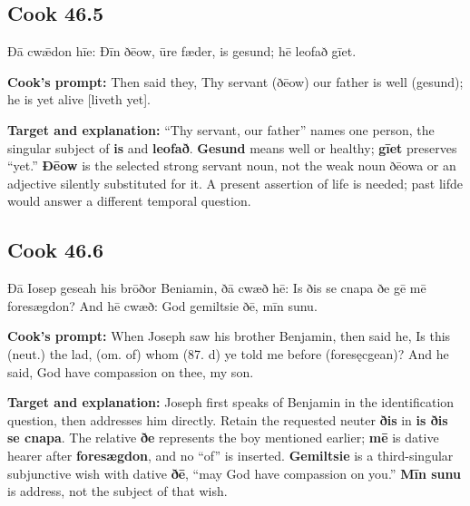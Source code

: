 \par\begin{minipage}{\linewidth}\raggedright
\subsection*{Cook 46.5}

Ðā cwǣdon hīe: Ðīn ðēow, ūre fæder, is gesund; hē leofað gīet.

\textbf{Cook’s prompt:} Then said they, Thy servant (ðēow) our father is well (gesund); he is yet alive [liveth yet].

\textbf{Target and explanation:} “Thy servant, our father” names one person, the singular subject of \textbf{is} and \textbf{leofað}. \textbf{Gesund} means well or healthy; \textbf{gīet} preserves “yet.” \textbf{Ðēow} is the selected strong servant noun, not the weak noun ðēowa or an adjective silently substituted for it. A present assertion of life is needed; past lifde would answer a different temporal question.

\end{minipage}\par\addvspace{4pt}

\par\begin{minipage}{\linewidth}\raggedright
\subsection*{Cook 46.6}

Ðā Iosep geseah his brōðor Beniamin, ðā cwæð hē: Is ðis se cnapa ðe gē mē foresægdon? And hē cwæð: God gemiltsie ðē, mīn sunu.

\textbf{Cook’s prompt:} When Joseph saw his brother Benjamin, then said he, Is this (neut.) the lad, (om. of) whom (87. d) ye told me before (foresęcgean)? And he said, God have compassion on thee, my son.

\textbf{Target and explanation:} Joseph first speaks of Benjamin in the identification question, then addresses him directly. Retain the requested neuter \textbf{ðis} in \textbf{is ðis se cnapa}. The relative \textbf{ðe} represents the boy mentioned earlier; \textbf{mē} is dative hearer after \textbf{foresægdon}, and no “of” is inserted. \textbf{Gemiltsie} is a third-singular subjunctive wish with dative \textbf{ðē}, “may God have compassion on you.” \textbf{Mīn sunu} is address, not the subject of that wish.

\end{minipage}\par\addvspace{4pt}


